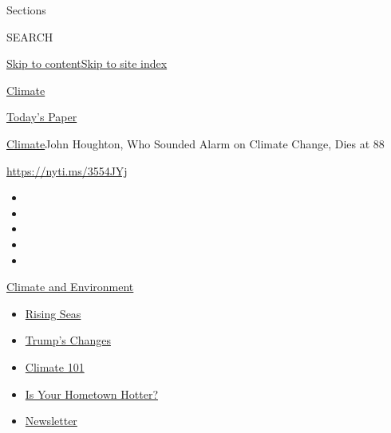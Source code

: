 Sections

SEARCH

\protect\hyperlink{site-content}{Skip to
content}\protect\hyperlink{site-index}{Skip to site index}

\href{https://www.nytimes.com/section/climate}{Climate}

\href{https://myaccount.nytimes.com/auth/login?response_type=cookie\&client_id=vi}{}

\href{https://www.nytimes.com/section/todayspaper}{Today's Paper}

\href{/section/climate}{Climate}\textbar{}John Houghton, Who Sounded
Alarm on Climate Change, Dies at 88

\url{https://nyti.ms/3554JYj}

\begin{itemize}
\item
\item
\item
\item
\item
\end{itemize}

\href{https://www.nytimes.com/section/climate?action=click\&pgtype=Article\&state=default\&region=TOP_BANNER\&context=storylines_menu}{Climate
and Environment}

\begin{itemize}
\tightlist
\item
  \href{https://www.nytimes.com/2020/07/30/climate/sea-level-inland-floods.html?action=click\&pgtype=Article\&state=default\&region=TOP_BANNER\&context=storylines_menu}{Rising
  Seas}
\item
  \href{https://www.nytimes.com/interactive/2020/climate/trump-environment-rollbacks.html?action=click\&pgtype=Article\&state=default\&region=TOP_BANNER\&context=storylines_menu}{Trump's
  Changes}
\item
  \href{https://www.nytimes.com/interactive/2020/04/19/climate/climate-crash-course-1.html?action=click\&pgtype=Article\&state=default\&region=TOP_BANNER\&context=storylines_menu}{Climate
  101}
\item
  \href{https://www.nytimes.com/interactive/2018/08/30/climate/how-much-hotter-is-your-hometown.html?action=click\&pgtype=Article\&state=default\&region=TOP_BANNER\&context=storylines_menu}{Is
  Your Hometown Hotter?}
\item
  \href{https://www.nytimes.com/newsletters/climate-change?action=click\&pgtype=Article\&state=default\&region=TOP_BANNER\&context=storylines_menu}{Newsletter}
\end{itemize}

